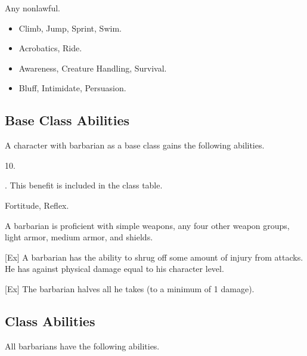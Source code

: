      Any nonlawful.

    \begin{itemize}
        \item {} Climb, Jump, Sprint, Swim.
        \item {} Acrobatics, Ride.
        \item {} Awareness, Creature Handling, Survival.
        \item {} Bluff, Intimidate, Persuasion.
    \end{itemize}

    \subsection{Base Class Abilities}
        A character with barbarian as a base class gains the following abilities.

         10.

         . This benefit is included in the class table.

          Fortitude,  Reflex.

        A barbarian is proficient with simple weapons, any four other weapon groups, light armor, medium armor, and shields.

        [Ex]
        A barbarian has the ability to shrug off some amount of injury from attacks.
        He has  against physical damage equal to his character level.

        [Ex]
        The barbarian halves all  he takes (to a minimum of 1 damage).

    \subsection{Class Abilities}
        All barbarians have the following abilities.

